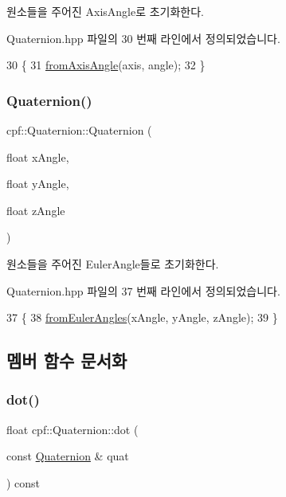 원소들을 주어진 Axis\+Angle로 초기화한다. 

Quaternion.\+hpp 파일의 30 번째 라인에서 정의되었습니다.


\begin{DoxyCode}
30                                                      \{
31             \hyperlink{classcpf_1_1_quaternion_a7d0860d74452a6b5de4ea70357bf3d95}{fromAxisAngle}(axis, angle);
32         \}
\end{DoxyCode}
\mbox{\label{classcpf_1_1_quaternion_a480873e169c88e8e6a53b268cd3b2505}} 
\subsubsection{\texorpdfstring{Quaternion()}{Quaternion()}\hspace{0.1cm}{\footnotesize\ttfamily [4/4]}}
{\footnotesize\ttfamily cpf\+::\+Quaternion\+::\+Quaternion (\begin{DoxyParamCaption}\item[{float}]{x\+Angle,  }\item[{float}]{y\+Angle,  }\item[{float}]{z\+Angle }\end{DoxyParamCaption})\hspace{0.3cm}{\ttfamily [inline]}}

원소들을 주어진 Euler\+Angle들로 초기화한다. 

Quaternion.\+hpp 파일의 37 번째 라인에서 정의되었습니다.


\begin{DoxyCode}
37                                                              \{
38             \hyperlink{classcpf_1_1_quaternion_a7cf9179b0d364d55c501666af142086a}{fromEulerAngles}(xAngle, yAngle, zAngle);
39         \}
\end{DoxyCode}


\subsection{멤버 함수 문서화}
\mbox{\label{classcpf_1_1_quaternion_af5daf9d5ace6555f220e3af815c7cc5c}} 
\subsubsection{\texorpdfstring{dot()}{dot()}}
{\footnotesize\ttfamily float cpf\+::\+Quaternion\+::dot (\begin{DoxyParamCaption}\item[{const \hyperlink{classcpf_1_1_quaternion}{Quaternion} \&}]{quat }\end{DoxyParamCaption}) const\hspace{0.3cm}{\ttfamily [inline]}}



